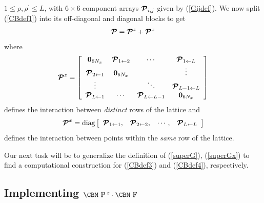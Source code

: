 $1 \le \rho,\rho^{\prime} \le L$, with $6\times 6$ component arrays ${\mbox{\boldmath$\cal P$\unboldmath}}_{i,j}$ 
given by (\ref{Gijdef}). We now split (\ref{CBdef1}) into its off-diagonal 
and diagonal blocks to get
\begin{equation} \label{CBGsplit}
{\mbox{\boldmath$\cal P$\unboldmath}}={\mbox{\boldmath$\cal P$\unboldmath}}{}^{z} + {\mbox{\boldmath$\cal P$\unboldmath}}{}^{x}
\end{equation}
where
\begin{equation} \label{CBdef3}
{\mbox{\boldmath$\cal P$\unboldmath}}{}^{z}=\left[{\begin{array}{cccc}
{\bf 0}_{6N_x}&{\mbox{\boldmath$\cal P$\unboldmath}}_{1 
\leftarrow   2}&\cdots &{\mbox{\boldmath$\cal P$\unboldmath}}_{1 \leftarrow   L}\\ {\mbox{\boldmath$\cal P$\unboldmath}}_{2 
\leftarrow   1}&{\bf 0}_{6N_x}&&\vdots\\ 
\vdots&&\ddots&{\mbox{\boldmath$\cal P$\unboldmath}}_{L-1 \leftarrow   L}\\ {\mbox{\boldmath$\cal P$\unboldmath}}_{L \leftarrow   
1}&\cdots &{\mbox{\boldmath$\cal P$\unboldmath}}_{L \leftarrow   L-1}&{\bf 0}_{6N_x}\end{array}}\right] 
\end{equation}
defines the interaction between {\em distinct\/} rows of the lattice
and
\begin{equation} \label{CBdef4}
{\mbox{\boldmath$\cal P$\unboldmath}}^{x}=\mbox{diag}\left[\begin{array}{cccc}
{\mbox{\boldmath$\cal P$\unboldmath}}_{1 \leftarrow   1},&{\mbox{\boldmath$\cal P$\unboldmath}}_{2 
\leftarrow   2},&\cdots, &{\mbox{\boldmath$\cal P$\unboldmath}}_{L \leftarrow   L}
\end{array}\right] 
\end{equation}
defines the interaction between points within the  {\em same\/} row of the 
lattice.


Our next task will be to generalize the definition of (\ref{superG}), (\ref{superGx})
 to find a computational construction for (\ref{CBdef3}) and 
(\ref{CBdef4}), respectively.

\subsection{ Implementing $\mbox{\CBM  P}\,{}^{z}\cdot\mbox{\CBM  F}$}

 
 
 
 

